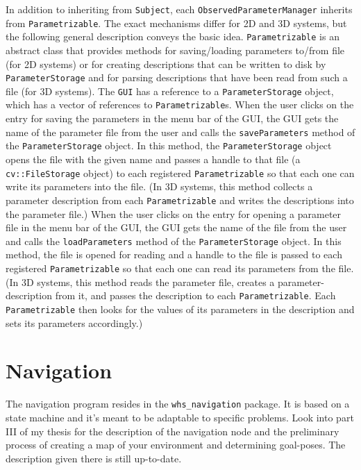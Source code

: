 \documentclass{article}
\newcommand{\code}[1]{\texttt{#1}}
\begin{document}
In addition to inheriting from \code{Subject}, each \code{ObservedParameterManager}
inherits from \code{Parametrizable}.
The exact mechanisms differ for 2D and 3D systems, but the following general description
conveys the basic idea.
\code{Parametrizable} is an abstract class that provides methods for saving/loading
parameters to/from file (for 2D systems) or for creating descriptions that can be
written to disk by \code{ParameterStorage} and
for parsing descriptions that have been read from such a file (for 3D systems).
The \code{GUI} has a reference to a \code{ParameterStorage} object, which has a
vector of references to \code{Parametrizable}s.
When the user clicks on the entry for saving the parameters in the menu bar of the
GUI, the GUI gets the name of the parameter file from the user and calls the
\code{saveParameters} method of the \code{ParameterStorage} object.
In this method, the \code{ParameterStorage} object opens the file with
the given name and passes a handle to that file (a \code{cv::FileStorage} object)
to each registered \code{Parametrizable} so that each one can write its parameters
into the file.
(In 3D systems, this method collects a
parameter description from each \code{Parametrizable} and writes the descriptions
into the parameter file.)
When the user clicks on the entry for opening a parameter file in the menu bar of the
GUI, the GUI gets the name of the file from the user and calls the
\code{loadParameters} method of the \code{ParameterStorage} object.
In this method, the file is opened for reading and a handle to the file 
is passed to each registered \code{Parametrizable} so that each one can
read its parameters from the file.
(In 3D systems, this method reads the parameter file, creates a parameter-description
from it, and passes the description to each \code{Parametrizable}.
Each \code{Parametrizable} then looks for the values of its parameters in the description
and sets its parameters accordingly.)


\section{Navigation}

\label{sec:navi}
The navigation program resides in the \code{whs\_navigation} package.
It is based on a state machine and it's meant to be adaptable to
specific problems.
Look into part III of my thesis for the description of the navigation node
and the preliminary process of creating a map of your environment and 
determining goal-poses.
The description given there is still up-to-date.
\end{document}
